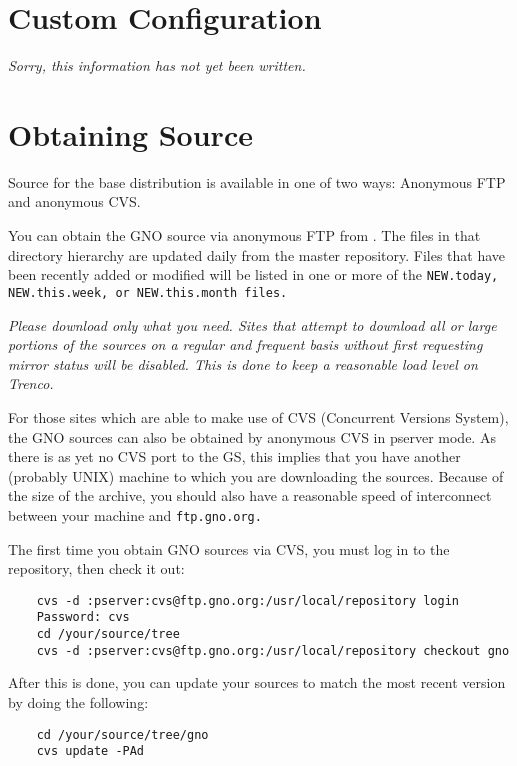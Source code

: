 \documentclass{report}
\begin{document}
\section{Custom Configuration}

\it Sorry, this information has not yet been written.\rm

\section{Obtaining Source}

Source for the base distribution is available in one of two ways:
Anonymous FTP and anonymous CVS.

You can obtain the GNO source via anonymous FTP from 
.
The files in that directory hierarchy are updated daily from the
master repository.  Files that have been recently added or modified
will be listed in one or more of the 
\tt NEW.today\rm ,
\tt NEW.this.week\rm , or
\tt NEW.this.month \rm
files.

\em Please download only what you need.  Sites that attempt to download
all or large portions of the sources on a regular and frequent basis
without first requesting mirror status will be disabled. This is done
to keep a reasonable load level on Trenco.\rm

For those sites which are able to make use of CVS (Concurrent Versions
System), the GNO sources can also be obtained by anonymous CVS in 
pserver mode.  As there is as yet no CVS port to the GS, this implies
that you have another (probably UNIX) machine to which you are downloading
the sources.  Because of the size of the archive, you should also have
a reasonable speed of interconnect between your machine and \tt ftp.gno.org\rm.

The first time you obtain GNO sources via CVS, you must log in to the
repository, then check it out:

\begin{verbatim}
	cvs -d :pserver:cvs@ftp.gno.org:/usr/local/repository login
	Password: cvs
	cd /your/source/tree
	cvs -d :pserver:cvs@ftp.gno.org:/usr/local/repository checkout gno
\end{verbatim}

After this is done, you can update your sources to match the most recent
version by doing the following:

\begin{verbatim}
	cd /your/source/tree/gno
	cvs update -PAd
\end{verbatim}
\end{document}
